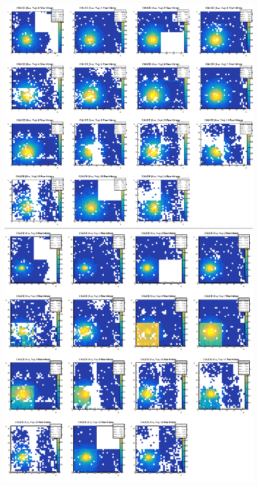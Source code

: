 \begin{figure}[H]
  \begin{minipage}[b]{0.45\linewidth}
    \centering
    \includegraphics[keepaspectratio, scale=0.5]{Figure/Beamtest/hitmap_e20.png}
  \end{minipage}
    \begin{minipage}[b]{0.45\linewidth}
    \centering
    \includegraphics[keepaspectratio, scale=0.5]{Figure/Beamtest/hitmap_e150.png}

\end{minipage}
\end{figure}

